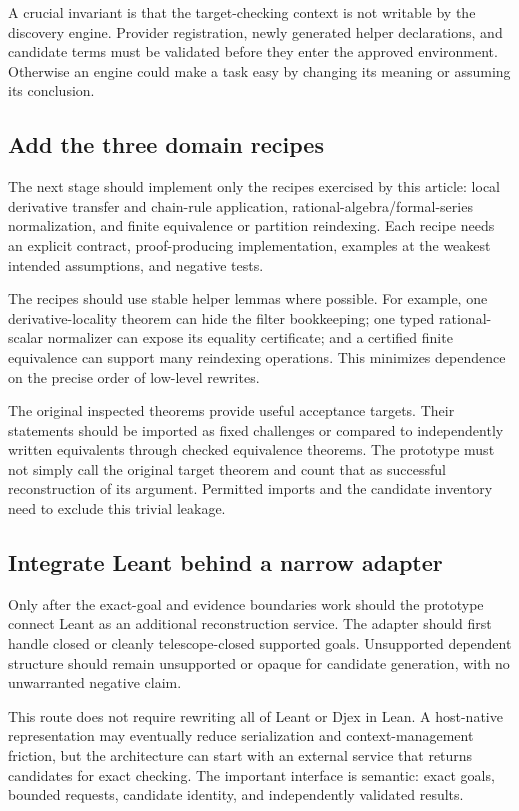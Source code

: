 \documentclass[11pt,letterpaper]{article}
\theoremstyle{remark}
\begin{document}
A crucial invariant is that the target-checking context is not writable by the discovery engine. Provider registration, newly generated helper declarations, and candidate terms must be validated before they enter the approved environment. Otherwise an engine could make a task easy by changing its meaning or assuming its conclusion.

\subsection{Add the three domain recipes}

The next stage should implement only the recipes exercised by this article: local derivative transfer and chain-rule application, rational-algebra/formal-series normalization, and finite equivalence or partition reindexing. Each recipe needs an explicit contract, proof-producing implementation, examples at the weakest intended assumptions, and negative tests.

The recipes should use stable helper lemmas where possible. For example, one derivative-locality theorem can hide the filter bookkeeping; one typed rational-scalar normalizer can expose its equality certificate; and a certified finite equivalence can support many reindexing operations. This minimizes dependence on the precise order of low-level rewrites.

The original inspected theorems provide useful acceptance targets. Their statements should be imported as fixed challenges or compared to independently written equivalents through checked equivalence theorems. The prototype must not simply call the original target theorem and count that as successful reconstruction of its argument. Permitted imports and the candidate inventory need to exclude this trivial leakage.

\subsection{Integrate Leant behind a narrow adapter}

Only after the exact-goal and evidence boundaries work should the prototype connect Leant as an additional reconstruction service. The adapter should first handle closed or cleanly telescope-closed supported goals. Unsupported dependent structure should remain unsupported or opaque for candidate generation, with no unwarranted negative claim.

This route does not require rewriting all of Leant or Djex in Lean. A host-native representation may eventually reduce serialization and context-management friction, but the architecture can start with an external service that returns candidates for exact checking. The important interface is semantic: exact goals, bounded requests, candidate identity, and independently validated results.
\end{document}

